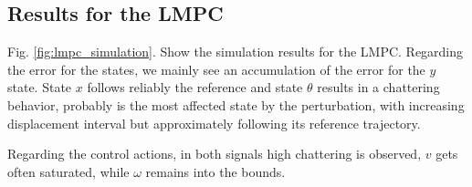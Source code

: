 \documentclass[conference]{IEEEtran}
\begin{document}
\subsection{Results for the LMPC}\label{CB}

Fig. \ref{fig:lmpc_simulation}. Show the simulation results for the LMPC. Regarding the error for the states, we mainly see an accumulation of the error for the \(y\) state. State \(x\) follows reliably the reference and state \(\theta\) results in a chattering behavior, probably is the most affected state by the perturbation, with increasing displacement interval but approximately following its reference trajectory.

Regarding the control actions, in both signals high chattering is observed, \(v\) gets often saturated, while \(\omega\) remains into the bounds.
\end{document}
